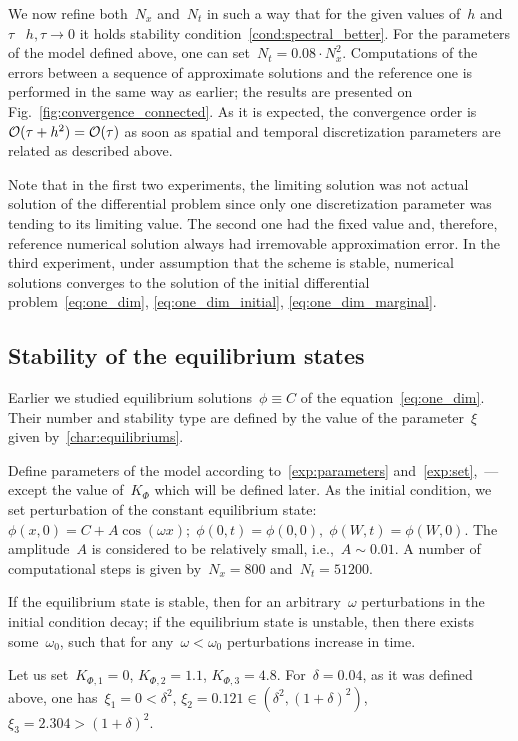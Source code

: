 We now refine both~$N_x$ and~$N_t$ in such a way that for the given
values of~$h$ and~$\tau$ ~$h, \tau \to 0$ it holds stability
condition~\eqref{cond:spectral_better}.
For the parameters of the model defined above, one can set~$N_t = 0.08
\cdot N_x^2$.
Computations of the errors between a sequence of approximate solutions and the reference one is
performed in the same way as earlier; the results are presented on
Fig.~\ref{fig:convergence_connected}.
As it is expected, the convergence order is~${\mathcal{O}} (\tau + h^2) =
{\mathcal{O}} (\tau)$ as soon as spatial and temporal discretization
parameters are related as described above.

Note that in the first two experiments, the limiting solution was not
actual
solution of the differential problem since only one discretization
parameter was tending to its limiting value. The second one
had the fixed value and, therefore, reference numerical solution
always had irremovable approximation error.
In the third experiment, under assumption that the scheme is stable,
numerical solutions converges to the solution of the initial
differential problem~\eqref{eq:one_dim}, \eqref{eq:one_dim_initial}, \eqref{eq:one_dim_marginal}.


\subsection{Stability of the equilibrium states}

Earlier we studied equilibrium solutions~$\phi \equiv C$ of the
equation~\eqref{eq:one_dim}.
Their number and stability type are defined by the value of
the parameter~$\xi$ given by~\eqref{char:equilibriums}.

Define parameters of the model according to~\eqref{exp:parameters}
and~\eqref{exp:set},~---
except the value of~$K_\Phi$  which will be defined later.
As the  initial condition, we set perturbation of the constant
equilibrium state:
$\phi(x, 0) = C + A \cos(\omega x); \; \phi(0, t) = \phi(0, 0), \;
\phi(W, t) = \phi(W, 0)$.
The amplitude~$A$ is considered to be relatively small, i.e.,~$A\sim0.01$.
A number of computational steps is given by~$N_x = 800$ and~$N_t = 51200$.

If the equilibrium state is stable, then for an arbitrary~$\omega$
perturbations in the initial condition decay;
if the equilibrium state is unstable, then there exists
some~$\omega_0$,
such that for any~$\omega < \omega_0$ perturbations increase in time.

Let us set~$K_{\Phi, 1} = 0$, $K_{\Phi, 2} = 1.1$, $K_{\Phi, 3} =
4.8$. For~$\delta = 0.04$, as it was defined above,
one has~$\xi_1 = 0 < \delta^2$,
$\xi_2 = 0.121 \in (\delta^2, (1+\delta)^2)$, $\xi_3 = 2.304 > (1 + \delta)^2$.

